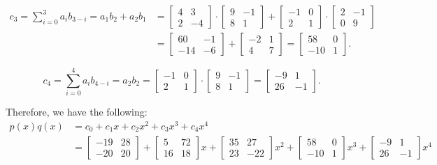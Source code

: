 \begin{align*}
c_3 = \sum_{i = 0}^3 a_i b_{3 - i} = a_1b_2+a_2b_1&= \begin{bmatrix} 
4 & 3 \\
2 & -4
\end{bmatrix} \cdot \begin{bmatrix} 
9 & -1\\
8 & 1
\end{bmatrix}+ \begin{bmatrix} 
-1 & 0\\
2 & 1
\end{bmatrix} \cdot\begin{bmatrix}
2 & -1\\
0 & 9
\end{bmatrix}\\
&=\begin{bmatrix}
60 & -1\\
-14 & -6
\end{bmatrix}+\begin{bmatrix}
-2 & 1\\
4 & 7
\end{bmatrix}=\begin{bmatrix}
58 & 0\\
-10 & 1
\end{bmatrix} .
\end{align*}

\[c_4 = \sum_{i = 0}^4 a_i b_{4 - i} = a_2b_2= \begin{bmatrix} 
-1 & 0 \\
2 & 1
\end{bmatrix} \cdot \begin{bmatrix} 
9 & -1\\
8 & 1
\end{bmatrix}=\begin{bmatrix}
-9 & 1\\
26 & -1
\end{bmatrix}.\]
\medskip

\noindent Therefore, we have the following:
\begin{align*}
p(x)q(x) &=c_0+c_1x+c_2x^2+c_3x^3+c_4x^4\\
&=\begin{bmatrix} 
-19 & 28  \\
-20 & 20 
\end{bmatrix}+
\begin{bmatrix} 
5 & 72 \\
16 & 18
\end{bmatrix}x+
\begin{bmatrix} 
35 &27 \\
23 & -22
\end{bmatrix}x^2+
\begin{bmatrix} 
58 & 0 \\
-10 & 1
\end{bmatrix}x^3+
\begin{bmatrix} 
-9 & 1 \\
26 & -1 
\end{bmatrix}x^4
\end{align*}

